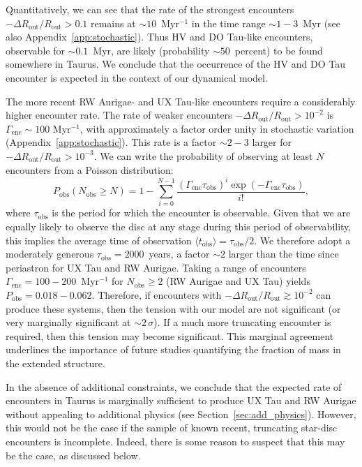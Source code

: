 \documentclass{aa}
\begin{document}
Quantitatively, we can see that the rate of the strongest encounters $-\Delta R_\mathrm{out}/R_\mathrm{out} > 0.1$ remains at $\sim 10$~Myr$^{-1}$ in the time range $\sim 1{-}3$~Myr (see also Appendix~\ref{app:stochastic}). Thus HV and DO Tau-like encounters, observable for $\sim 0.1$~Myr, are likely (probability $\sim 50$~percent) to be found somewhere in Taurus. We conclude that the occurrence of the HV and DO Tau encounter is expected in the context of our dynamical model. 

The more recent RW Aurigae- and UX Tau-like encounters require a considerably higher encounter rate. The rate of weaker encounters $-\Delta R_\mathrm{out}/R_\mathrm{out} > 10^{-2}$ is $\Gamma_\mathrm{enc} \sim 100$ Myr$^{-1}$, with approximately a factor order unity in stochastic variation (Appendix~\ref{app:stochastic}). This rate is a factor $\sim 2{-}3$ larger for $-\Delta R_\mathrm{out}/R_\mathrm{out} > 10^{-3}$. We can write the probability of observing at least $N$  encounters from a Poisson distribution:
\begin{equation}
\label{eq:Pobs}
    P_\mathrm{obs} (N_\mathrm{obs} \geq N) = 1- \sum_{i=0}^{N-1}\frac{ ( \Gamma_\mathrm{enc} \tau_\mathrm{obs})^{i}\exp(- \Gamma_\mathrm{enc} \tau_\mathrm{obs}) }{i !},
\end{equation}where $\tau_\mathrm{obs}$ is the period for which the encounter is observable. Given that we are equally likely to observe the disc at any stage during this period of observability, this implies the average time of observation $\langle t_\mathrm{obs} \rangle = \tau_\mathrm{obs}/2$. We therefore adopt a moderately generous $\tau_\mathrm{obs} = 2000$~years, a factor $\sim 2$ larger than the time since periastron for UX Tau and RW Aurigae. Taking a range of encounters $\Gamma_\mathrm{enc} = 100{-}200$~Myr$^{-1}$ for $N_\mathrm{obs} \geq 2$ (RW Aurigae and UX Tau) yields $P_\mathrm{obs} = 0.018 {-} 0.062$. Therefore, if encounters with $-\Delta R_\mathrm{out}/R_\mathrm{out} \gtrsim 10^{-2}$ can produce these systems, then the tension with our model are not significant (or very marginally significant at $\sim 2\, \sigma$). If a much more truncating encounter is required, then this tension may become significant. This marginal agreement underlines the importance of future studies quantifying the fraction of mass in the extended structure. 

In the absence of additional constraints, we conclude that the expected rate of encounters in Taurus is marginally sufficient to produce UX Tau and RW Aurigae without appealing to additional physics (see Section~\ref{sec:add_physics}). However, this would not be the case if the sample of known recent, truncating star-disc encounters is incomplete. Indeed, there is some reason to suspect that this may be the case, as discussed below. 
\end{document}
